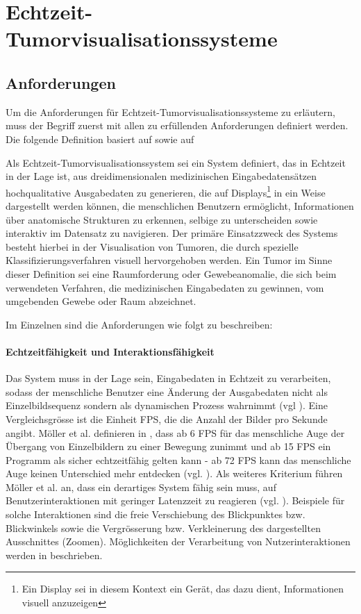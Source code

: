 \documentclass[pdftex,a4paper,titlepage,12pt]{scrartcl}
\newtheorem[L]{boxedDefinition}{Definition}
\begin{document}
\section{Echtzeit-Tumorvisualisationssysteme}\label{sec:vissystems}
\subsection{Anforderungen}\label{ssec:requirements}
Um die Anforderungen für Echtzeit-Tumorvisualisationssysteme zu erläutern, muss der Begriff zuerst mit allen zu erfüllenden Anforderungen definiert werden. Die folgende Definition basiert auf \cite[Kapitel 3.1.1, Seite 17]{Bruckner2004} sowie auf \cite{Kutter2008}
\begin{boxedDefinition}\label{def:rttumorvissystem}
 Als Echtzeit-Tumorvisualisationssystem sei ein System definiert, das in Echtzeit in der Lage ist, aus dreidimensionalen medizinischen Eingabedatensätzen hochqualitative Ausgabedaten zu generieren, die auf Displays\footnote{Ein Display sei in diesem Kontext ein Gerät, das dazu dient, Informationen visuell anzuzeigen} in ein Weise dargestellt werden können, die menschlichen Benutzern ermöglicht, Informationen über anatomische Strukturen zu erkennen, selbige zu unterscheiden sowie interaktiv im Datensatz zu navigieren. Der primäre Einsatzzweck des Systems besteht hierbei in der Visualisation von Tumoren, die durch spezielle Klassifizierungsverfahren visuell hervorgehoben werden.
 Ein Tumor im Sinne dieser Definition sei eine Raumforderung oder Gewebeanomalie, die sich beim verwendeten Verfahren, die medizinischen Eingabedaten zu gewinnen, vom umgebenden Gewebe oder Raum abzeichnet.
\end{boxedDefinition}
\newpage
\noindent Im Einzelnen sind die Anforderungen wie folgt zu beschreiben:
\paragraph{Echtzeitfähigkeit und Interaktionsfähigkeit} \label{p:rtcapability} Das System muss in der Lage sein, Eingabedaten in Echtzeit zu verarbeiten, sodass der menschliche Benutzer eine Änderung der Ausgabedaten nicht als Einzelbildsequenz sondern als dynamischen Prozess wahrnimmt (vgl \cite[Kapitel 1, Seite 1]{Moeller2008}). Eine Vergleichsgrösse ist die Einheit FPS, die die Anzahl der Bilder pro Sekunde angibt. Möller et al. definieren in \cite{Moeller2008}, dass ab 6 FPS für das menschliche Auge der Übergang von Einzelbildern zu einer Bewegung zunimmt und ab 15 FPS ein Programm als sicher echtzeitfähig gelten kann - ab 72 FPS kann das menschliche Auge keinen Unterschied mehr entdecken (vgl. \cite[Kapitel 1, Seite 1]{Moeller2008}). Als weiteres Kriterium führen Möller et al. an, dass ein derartiges System fähig sein muss, auf Benutzerinteraktionen mit geringer Latenzzeit zu reagieren (vgl. \cite[Kapitel 1, Seite 1]{Moeller2008}). Beispiele für solche Interaktionen sind die freie Verschiebung des Blickpunktes bzw. Blickwinkels sowie die Vergrösserung bzw. Verkleinerung des dargestellten Ausschnittes (\glqq Zoomen\grqq). Möglichkeiten der Verarbeitung von Nutzerinteraktionen werden in \cite[Kapitel 3.6, Seite 62-66]{Bruckner2004} beschrieben.
\end{document}
